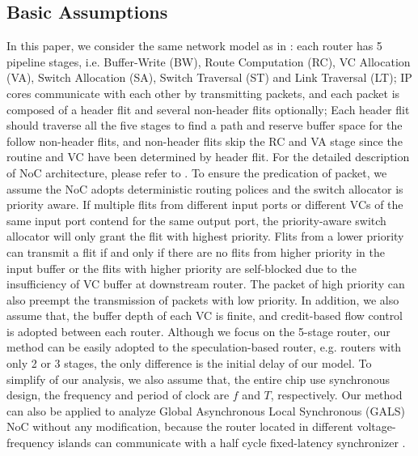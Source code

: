 \documentclass[10pt,journal]{IEEEtran}
\begin{document}
\subsection{Basic Assumptions}
In this paper, we consider the same network model as in \cite{627905}\cite{Shi:2008:RCA:1397757.1397996}\cite{707545}\cite{73}: each router has 5 pipeline stages, i.e. Buffer-Write (BW), Route Computation (RC), VC Allocation (VA), Switch Allocation (SA), Switch Traversal (ST) and Link Traversal (LT); IP cores communicate with each other by transmitting packets, and each packet is composed of a header flit and several non-header flits optionally; Each header flit should traverse all the five stages to find a path and reserve buffer space for the follow non-header flits, and non-header flits skip the RC and VA stage since the routine and VC have been determined by header flit. For the detailed description of NoC architecture, please refer to \cite{jerger2009chip}\cite{DaTo04}. To ensure the predication of packet, we assume the NoC adopts deterministic routing polices and the switch allocator is priority aware. If multiple flits from different input ports or different VCs of the same input port contend for the same output port, the priority-aware switch allocator will only grant the flit with highest priority. Flits from a lower priority can transmit a flit if and only if there are no flits from higher priority in the input buffer or the flits with higher priority are self-blocked due to the insufficiency of VC buffer at downstream router. The packet of high priority can also preempt the transmission of packets with low priority. In addition, we also assume that, the buffer depth of each VC is finite, and credit-based flow control is adopted between each router.
Although we focus on the 5-stage router, our method can be easily adopted to the speculation-based router, e.g. routers with only 2 or 3 stages, the only difference is the initial delay of our model. To simplify of our analysis, we also assume that, the entire chip use synchronous design, the frequency and period of clock are $f$ and $T$, respectively. Our method can also be applied to analyze Global Asynchronous Local Synchronous (GALS) NoC without any modification, because the router located in different voltage-frequency islands can communicate with a half cycle fixed-latency synchronizer \cite{5476986}.
\end{document}
